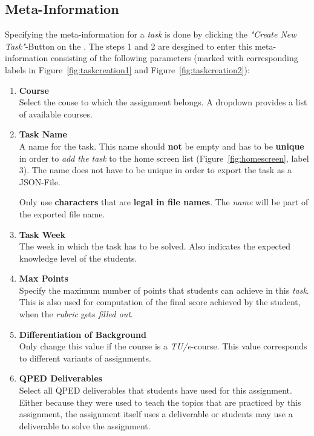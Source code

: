 \subsection{Meta-Information}
\label{sub:metainfo}
Specifying the meta-information for a \textit{task} is done by clicking the \textit{"Create New Task"}-Button on the .
The steps 1 and 2 are desgined to enter this meta-information consisting of the following parameters (marked with corresponding labels 
in Figure~\ref{fig:taskcreation1} and Figure~\ref{fig:taskcreation2}):

\begin{enumerate}
  \item \textbf{Course} \\
    Select the couse to which the assignment belongs. A dropdown provides a list of available courses.
  \item \textbf{Task Name} \\
    A name for the task. This name should \textbf{not} be empty and has to be \textbf{unique} in order to \textit{add the task} to the home screen list (Figure~\ref{fig:homescreen}, label 3). The name does not have to be unique in order to export the task as a JSON-File.
    \begin{attention}
      Only use \textbf{characters} that are \textbf{legal in file names}. The \textit{name} will be part of the exported file name.
    \end{attention}
  \item \textbf{Task Week} \\
    The week in which the task has to be solved. Also indicates the expected knowledge level of the students.
  \item \textbf{Max Points} \\
    Specify the maximum number of points that students can achieve in this \textit{task}. This is also used for computation of the final score achieved by the student, when the \textit{rubric} gets \textit{filled out}.
  \item \textbf{Differentiation of Background} \\
    Only change this value if the course is a \textit{TU/e}-course. This value corresponds to different variants of assignments.
  \item \textbf{QPED Deliverables} \\
    Select all QPED deliverables that students have used for this assignment. Either because they were used to teach the topics that are practiced by this assignment, the assignment itself uses a deliverable or students may use a deliverable to solve the assignment. 

\end{enumerate}
